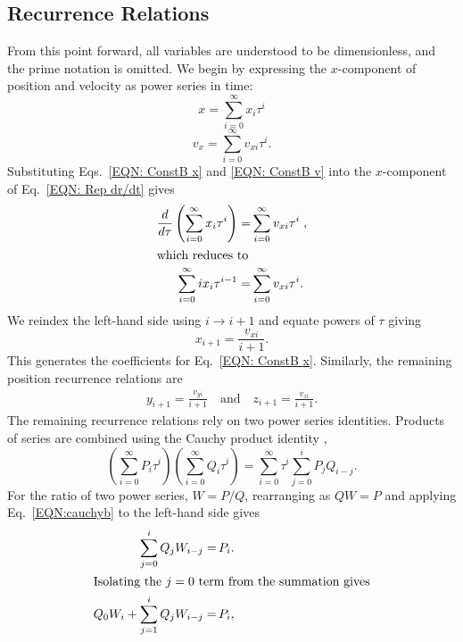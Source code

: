 \documentclass[draft]{agujournal2019}
\begin{document}
\subsection{Recurrence Relations}
From this point forward, all variables are understood to be dimensionless, and the prime notation is omitted. We begin by expressing the $x$-component of position and velocity as power series in time:
        \begin{equation}\label{EQN: ConstB x}
            x=\sum_{i=0}^\infty x_i\tau^i
        \end{equation}
        \begin{equation}\label{EQN: ConstB v}
            v_x=\sum_{i=0}^\infty v_{xi}\tau^i .
        \end{equation}
Substituting Eqs.~\eqref{EQN: ConstB x} and \eqref{EQN: ConstB v} into the
$x$-component of Eq.~\eqref{EQN: Rep dr/dt} gives
    \begin{align*}
            \frac{d}{d\tau}\left(\sum_{i=0}^\infty x_i\tau^i\right)=& \sum_{i=0}^\infty v_{xi}\tau^i\;,\\
\intertext{which reduces to}
            \sum_{i=0}^\infty ix_i\tau^{i-1}=&\sum_{i=0}^\infty v_{xi}\tau^i.
    \end{align*}
We reindex the left-hand side using $i \to i+1$ and equate powers of $\tau$ giving
    \begin{equation*}
        x_{i+1}=\frac{v_{xi}}{i+1}.
    \end{equation*}
This generates the coefficients for Eq.~\eqref{EQN: ConstB x}. Similarly, the remaining position recurrence relations are
        \begin{align*}
            y_{i+1}=\frac{v_{yi}}{i+1}\quad
            \mbox{and}\quad
            z_{i+1}=\frac{v_{zi}}{i+1}.
        \end{align*}
The remaining recurrence relations rely on two power series identities. Products of series are combined using the Cauchy product identity \cite{Knuth1997},
        \begin{equation}
            \left(\sum_{i=0}^\infty P_i\tau^i\right)\left(\sum_{i=0}^\infty Q_i\tau^i\right)
            =\sum_{i=0}^\infty\tau^i\sum_{j=0}^i P_jQ_{i-j}.
            \label{EQN:cauchyb}
        \end{equation}
For the ratio of two power series, $W=P/Q$, rearranging as $QW=P$ and applying Eq.~\eqref{EQN:cauchyb} to the left-hand side gives
    \begin{align*}
        \sum_{j=0}^i Q_jW_{i-j}=&\,P_i.\\
\intertext{Isolating the $j=0$ term from the summation gives}
        Q_0W_i+\sum_{j=1}^i Q_jW_{i-j}=&\,P_i,
    \end{align*}
\end{document}
